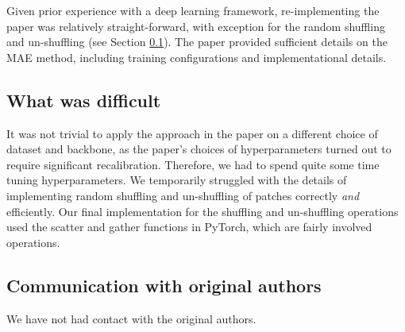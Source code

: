 
Given prior experience with a deep learning framework, re-implementing the paper was relatively straight-forward, with exception for the random shuffling and un-shuffling (see Section \ref{sec:difficult}). The paper provided sufficient details on the MAE method, including training configurations and implementational details.

\subsection{What was difficult}
\label{sec:difficult}


It was not trivial to apply the approach in the paper on a different choice of dataset and backbone, as the paper's choices of hyperparameters turned out to require significant recalibration. Therefore, we had to spend quite some time tuning hyperparameters. We temporarily struggled with the details of implementing random shuffling and un-shuffling of patches correctly \textit{and} efficiently. Our final implementation for the shuffling and un-shuffling operations used the scatter and gather functions in PyTorch, which are fairly involved operations. 

\subsection{Communication with original authors}

We have not had contact with the original authors.
